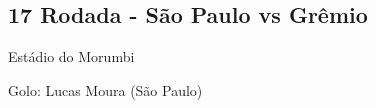 \newpage
\subsection{17 Rodada - São Paulo vs Grêmio}

\begin{figure}[H]
    \centering
    
\end{figure}

Estádio do Morumbi

Golo: Lucas Moura (São Paulo)


